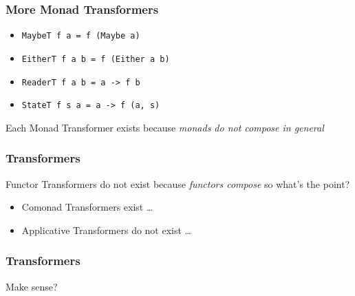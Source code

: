 \begin{frame}[fragile]
\frametitle{More Monad Transformers}
\begin{itemize}
  \item \lstinline $MaybeT f a = f (Maybe a)$
  \item \lstinline $EitherT f a b = f (Either a b)$
  \item \lstinline $ReaderT f a b = a -> f b$
  \item \lstinline $StateT f s a = a -> f (a, s)$
\end{itemize}
\begin{block}{Each Monad Transformer exists}
because \emph{monads do not compose in general}
\end{block}
\end{frame}

\begin{frame}[fragile]
\frametitle{Transformers}
\begin{block}{Functor Transformers do not exist}
because \emph{functors compose} so what's the point?
\end{block}
\begin{itemize}
\item Comonad Transformers exist \ldots
\item Applicative Transformers do not exist \ldots
\end{itemize}
\end{frame}

\begin{frame}[fragile]
\frametitle{Transformers}
Make sense?
\end{frame}
